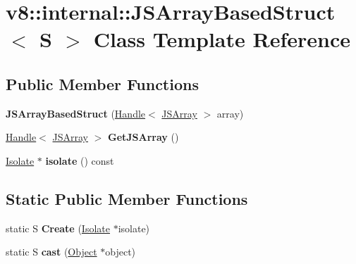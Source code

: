 \hypertarget{classv8_1_1internal_1_1_j_s_array_based_struct}{}\section{v8\+:\+:internal\+:\+:J\+S\+Array\+Based\+Struct$<$ S $>$ Class Template Reference}
\label{classv8_1_1internal_1_1_j_s_array_based_struct}
\subsection*{Public Member Functions}
\begin{DoxyCompactItemize}
\item 
{\bfseries J\+S\+Array\+Based\+Struct} (\hyperlink{classv8_1_1internal_1_1_handle}{Handle}$<$ \hyperlink{classv8_1_1internal_1_1_j_s_array}{J\+S\+Array} $>$ array)\hypertarget{classv8_1_1internal_1_1_j_s_array_based_struct_a1f5243bf50417d71e7e6d1f1eb4bc5dd}{}\label{classv8_1_1internal_1_1_j_s_array_based_struct_a1f5243bf50417d71e7e6d1f1eb4bc5dd}

\item 
\hyperlink{classv8_1_1internal_1_1_handle}{Handle}$<$ \hyperlink{classv8_1_1internal_1_1_j_s_array}{J\+S\+Array} $>$ {\bfseries Get\+J\+S\+Array} ()\hypertarget{classv8_1_1internal_1_1_j_s_array_based_struct_a6a184740e66c0839663d48f033912937}{}\label{classv8_1_1internal_1_1_j_s_array_based_struct_a6a184740e66c0839663d48f033912937}

\item 
\hyperlink{classv8_1_1internal_1_1_isolate}{Isolate} $\ast$ {\bfseries isolate} () const \hypertarget{classv8_1_1internal_1_1_j_s_array_based_struct_a5ab349ea3517e15e70f0813b89b428df}{}\label{classv8_1_1internal_1_1_j_s_array_based_struct_a5ab349ea3517e15e70f0813b89b428df}

\end{DoxyCompactItemize}
\subsection*{Static Public Member Functions}
\begin{DoxyCompactItemize}
\item 
static S {\bfseries Create} (\hyperlink{classv8_1_1internal_1_1_isolate}{Isolate} $\ast$isolate)\hypertarget{classv8_1_1internal_1_1_j_s_array_based_struct_a42478b81aac387c666de3c8be169f71c}{}\label{classv8_1_1internal_1_1_j_s_array_based_struct_a42478b81aac387c666de3c8be169f71c}

\item 
static S {\bfseries cast} (\hyperlink{classv8_1_1internal_1_1_object}{Object} $\ast$object)\hypertarget{classv8_1_1internal_1_1_j_s_array_based_struct_a1158491b87aaf389cfcb8803c4a6400e}{}\label{classv8_1_1internal_1_1_j_s_array_based_struct_a1158491b87aaf389cfcb8803c4a6400e}

\end{DoxyCompactItemize}
